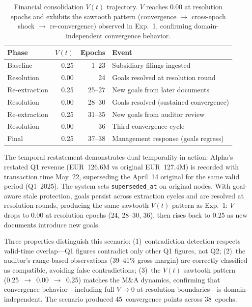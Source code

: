 \documentclass[11pt]{article}
\begin{document}
\begin{table}[H]
\centering
\small
\begin{tabular}{lrrl}
\toprule
\textbf{Phase} & \textbf{$V(t)$} & \textbf{Epochs} & \textbf{Event} \\
\midrule
Baseline        & 0.25 & 1--23  & Subsidiary filings ingested \\
Resolution      & 0.00 & 24     & Goals resolved at resolution round \\
Re-extraction   & 0.25 & 25--27 & New goals from later documents \\
Resolution      & 0.00 & 28--30 & Goals resolved (sustained convergence) \\
Re-extraction   & 0.25 & 31--35 & New goals from auditor review \\
Resolution      & 0.00 & 36     & Third convergence cycle \\
Final           & 0.25 & 37--38 & Management response (goals regress) \\
\bottomrule
\end{tabular}
\caption{Financial consolidation $V(t)$ trajectory. $V$ reaches 0.00 at resolution epochs and exhibits the sawtooth pattern (convergence $\to$ cross-epoch shock $\to$ re-convergence) observed in Exp.~1, confirming domain-independent convergence behavior.}
\label{tab:financial-results}
\end{table}

The temporal restatement demonstrates dual temporality in action: Alpha's restated Q1 revenue (EUR~126.6M vs original EUR~127.4M) is recorded with transaction time May~22, superseding the April~14 original for the same valid period (Q1~2025). The system sets \texttt{superseded\_at} on original nodes. With goal-aware stale protection, goals persist across extraction cycles and are resolved at resolution rounds, producing the same sawtooth $V(t)$ pattern as Exp.~1: $V$ drops to 0.00 at resolution epochs (24, 28--30, 36), then rises back to 0.25 as new documents introduce new goals.

Three properties distinguish this scenario: (1)~contradiction detection respects valid-time overlap---Q1 figures contradict only other Q1 figures, not Q2; (2)~the auditor's range-based observations (39--41\% gross margin) are correctly classified as compatible, avoiding false contradictions; (3)~the $V(t)$ sawtooth pattern (0.25~$\to$~0.00~$\to$~0.25) matches the M\&A dynamics, confirming that convergence behavior---including full $V \to 0$ at resolution boundaries---is domain-independent. The scenario produced 45~convergence points across 38~epochs.
\end{document}
